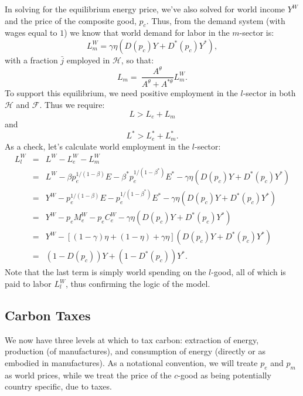 \documentclass[notitlepage,12pt]{article}
\begin{document}
In solving for the equilibrium energy price, we've also solved for world
income $Y^{W}$ and the price of the composite good, $p_{c}$. Thus, from the
demand system (with wages equal to $1$) we know that world demand for labor
in the $m$-sector is:%
\begin{equation*}
L_{m}^{W}=\gamma \eta \left( D(p_{c})Y+D^{\ast }(p_{c})Y^{\ast }\right) ,
\end{equation*}%
with a fraction $\bar{j}$ employed in $\mathcal{H}$, so that:%
\begin{equation*}
L_{m}=\ \frac{A^{\theta }}{A^{\theta }+A^{\ast \theta }}L_{m}^{W}.
\end{equation*}%
To support this equilibrium, we need positive employment in the $l$-sector
in both $\mathcal{H}$ and $\mathcal{F}$. Thus we require:%
\begin{equation*}
L>L_{e}+L_{m}
\end{equation*}%
and%
\begin{equation*}
L^{\ast }>L_{e}^{\ast }+L_{m}^{\ast }.
\end{equation*}%
As a check, let's calculate world employment in the $l$-sector:%
\begin{eqnarray*}
L_{l}^{W} &=&L^{W}-L_{e}^{W}-L_{m}^{W} \\
&=&L^{W}-\beta p_{e}^{1/(1-\beta )}E-\beta ^{\ast }p_{e}^{1/(1-\beta ^{\ast
})}E^{\ast }-\gamma \eta \left( D(p_{c})Y+D^{\ast }(p_{c})Y^{\ast }\right) \\
&=&Y^{W}-p_{e}^{1/(1-\beta )}E-p_{e}^{1/(1-\beta ^{\ast })}E^{\ast }-\gamma
\eta \left( D(p_{c})Y+D^{\ast }(p_{c})Y^{\ast }\right) \\
&=&Y^{W}-p_{e}M_{e}^{W}-p_{e}C_{e}^{W}-\gamma \eta \left( D(p_{c})Y+D^{\ast
}(p_{c})Y^{\ast }\right) \\
&=&Y^{W}-\left[ \left( 1-\gamma \right) \eta +\left( 1-\eta \right) +\gamma
\eta \right] \left( D(p_{c})Y+D^{\ast }(p_{c})Y^{\ast }\right) \\
&=&\left( 1-D(p_{c})\right) Y+\left( 1-D^{\ast }(p_{c})\right) Y^{\ast }.
\end{eqnarray*}%
Note that the last term is simply world spending on the $l$-good, all of
which is paid to labor $L_{l}^{W}$, thus confirming the logic of the model.

\subsection{Carbon Taxes}

We now have three levels at which to tax carbon: extraction of energy,
production (of manufactures), and consumption of energy (directly or as
embodied in manufactures). As a notational convention, we will treate $p_{e}$
and $p_{m}$ as world prices, while we treat the price of the $c$-good as
being potentially country specific, due to taxes.
\end{document}
